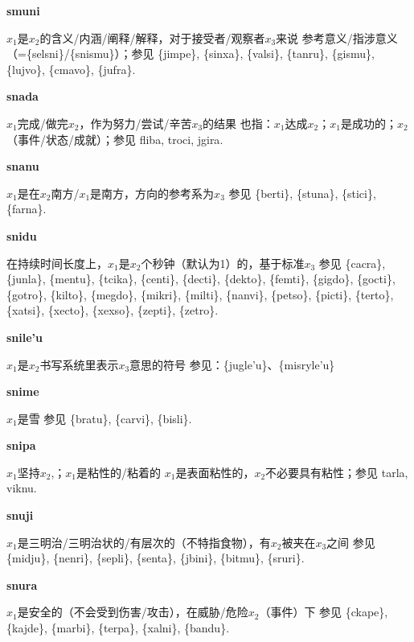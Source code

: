 \documentclass[notitlepage,twocolumn,a4paper,10pt]{book}
\begin{document}
{\sffamily\bfseries smuni}  $x_1$是$x_2$的含义\slash{}内涵\slash{}阐释\slash{}解释，对于接受者\slash{}观察者$x_3$来说 \textemdash{} 参考意义\slash{}指涉意义 （=\{selsni\}\slash{}\{snismu\}）；参见 \{jimpe\}, \{sinxa\}, \{valsi\}, \{tanru\}, \{gismu\}, \{lujvo\}, \{cmavo\}, \{jufra\}.

{\sffamily\bfseries snada}\enspace {\ttfamily\bfseries[sad]}  $x_1$完成\slash{}做完$x_2$，作为努力\slash{}尝试\slash{}辛苦$x_3$的结果 \textemdash{} 也指：$x_1$达成$x_2$；$x_1$是成功的；$x_2$（事件\slash{}状态\slash{}成就）；参见 {fliba}, {troci}, {jgira}.

{\sffamily\bfseries snanu}\enspace {\ttfamily\bfseries[nan]}  $x_1$是在$x_2$南方\slash{}$x_1$是南方，方向的参考系为$x_3$ \textemdash{} 参见 \{berti\}, \{stuna\}, \{stici\}, \{farna\}.

{\sffamily\bfseries snidu}\enspace {\ttfamily\bfseries[nid]}  在持续时间长度上，$x_1$是$x_2$个秒钟（默认为1）的，基于标准$x_3$ \textemdash{} 参见 \{cacra\}, \{junla\}, \{mentu\}, \{tcika\}, \{centi\}, \{decti\}, \{dekto\}, \{femti\}, \{gigdo\}, \{gocti\}, \{gotro\}, \{kilto\}, \{megdo\}, \{mikri\}, \{milti\}, \{nanvi\}, \{petso\}, \{picti\}, \{terto\}, \{xatsi\}, \{xecto\}, \{xexso\}, \{zepti\}, \{zetro\}.

{\sffamily\bfseries snile'u} $x_1$是$x_2$书写系统里表示$x_3$意思的符号 \textemdash{} 参见：\{jugle'u\}、\{misryle'u\}

{\sffamily\bfseries snime}\enspace {\ttfamily\bfseries[        si'e]}  $x_1$是雪 \textemdash{} 参见 \{bratu\}, \{carvi\}, \{bisli\}.

{\sffamily\bfseries snipa}\enspace {\ttfamily\bfseries[nip]}  $x_1$坚持$x_2$,；$x_1$是粘性的\slash{}粘着的 \textemdash{} $x_1$是表面粘性的，$x_2$不必要具有粘性；参见 {tarla}, {viknu}.

{\sffamily\bfseries snuji}\enspace {\ttfamily\bfseries[nuj]}  $x_1$是三明治\slash{}三明治状的\slash{}有层次的（不特指食物），有$x_2$被夹在$x_3$之间 \textemdash{} 参见 \{midju\}, \{nenri\}, \{sepli\}, \{senta\}, \{jbini\}, \{bitmu\}, \{sruri\}.

{\sffamily\bfseries snura}\enspace {\ttfamily\bfseries[nur     nu'a]}  $x_1$是安全的（不会受到伤害\slash{}攻击），在威胁\slash{}危险$x_2$（事件）下 \textemdash{} 参见 \{ckape\}, \{kajde\}, \{marbi\}, \{terpa\}, \{xalni\}, \{bandu\}.
\end{document}
